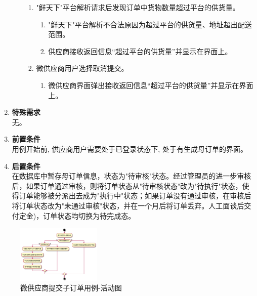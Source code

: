 \begin{enumerate}
\begin{enumerate}
\begin{enumerate}
            \item "鲜天下"平台解析请求后发现订单中货物数量超过平台的供货量。
            \begin{enumerate}
                \item "鲜天下"平台解析不合法原因为超过平台的供货量、地址超出配送范围。
                \item 供应商接收返回信息“超过平台的供货量”并显示在界面上。
            \end{enumerate}

            \item 微供应商用户选择取消提交。
            \begin{enumerate}
                \item 微供应商界面弹出接收返回信息“超过平台的供货量”并显示在界面上。
            \end{enumerate}

        \end{enumerate}
    \end{enumerate}
    \item \textbf{特殊需求} \\ 无。
    \item \textbf{前置条件} \\ 用例开始前, 供应商用户需要处于已登录状态下, 处于有生成母订单的界面。
    \item \textbf{后置条件} \\ 在数据库中暂存母订单信息，状态为"待审核"状态。经过管理员的进一步审核后，如果订单通过审核，则将订单状态从"待审核状态"改为"待执行"状态，使得订单能够被分派出去成为"执行中"状态；如果订单没有通过审核，在审核后将订单状态改为"未通过审核"状态，并在一个月后将订单丢弃。人工面谈后交付定金)，订单状态均切换为待完成态。
\end{enumerate}

\begin{figure}[htp]
    \centering
    \includegraphics[width=4cm]{image/chap01/uc_order_commit.png}
    \caption{微供应商提交子订单用例-活动图}
    \label{fig:uc_order_commit}
\end{figure}


